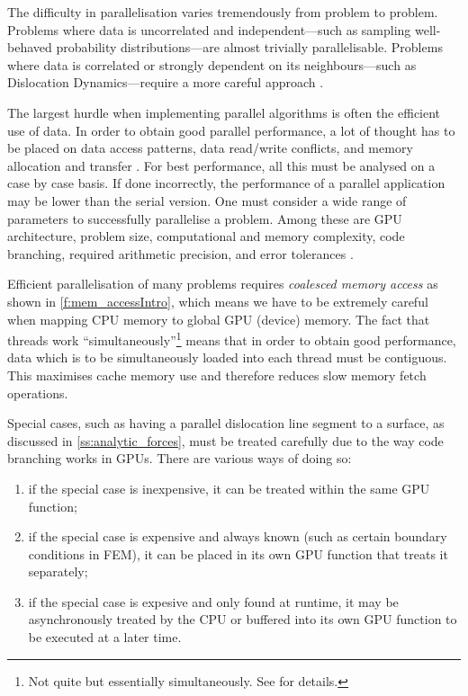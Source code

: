 The difficulty in parallelisation varies tremendously from problem to problem. Problems where data is uncorrelated and independent---such as sampling well-behaved probability distributions---are almost trivially parallelisable. Problems where data is correlated or strongly dependent on its neighbours---such as Dislocation Dynamics---require a more careful approach \cite{parallel_algs}.

The largest hurdle when implementing parallel algorithms is often the efficient use of data. In order to obtain good parallel performance, a lot of thought has to be placed on data access patterns, data read/write conflicts, and memory allocation and transfer \cite{nvidia}. For best performance, all this must be analysed on a case by case basis. If done incorrectly, the performance of a parallel application may be lower than the serial version. One must consider a wide range of parameters to successfully parallelise a problem. Among these are GPU architecture, problem size, computational and memory complexity, code branching, required arithmetic precision, and error tolerances \cite{nvidia, gpu_rev}.

Efficient parallelisation of many problems requires \emph{coalesced memory access} as shown in \cref{f:mem_accessIntro}, which means we have to be extremely careful when mapping CPU memory to global GPU (device) memory. The fact that threads work ``simultaneously''\footnote{Not quite but essentially simultaneously. See \cite{nvidia} for details.} means that in order to obtain good performance, data which is to be simultaneously loaded into each thread must be contiguous. This maximises cache memory use and therefore reduces slow memory fetch operations.

Special cases, such as having a parallel dislocation line segment to a surface, as discussed in \cref{ss:analytic_forces}, must be treated carefully due to the way code branching works in GPUs. There are various ways of doing so:
\begin{enumerate}
  \item if the special case is inexpensive, it can be treated within the same GPU function;
  \item if the special case is expensive and always known (such as certain boundary conditions in FEM), it can be placed in its own GPU function that treats it separately;
  \item if the special case is expesive and only found at runtime, it may be asynchronously treated by the CPU or buffered into its own GPU function to be executed at a later time.
\end{enumerate}

